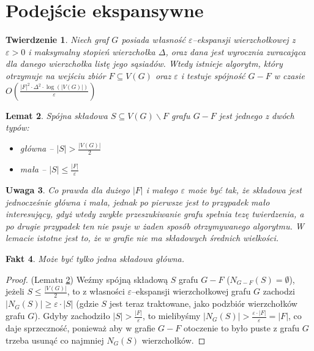 \documentclass{pracamgr}
\newtheorem{theorem}{Twierdzenie}[chapter]
\newtheorem{lemma}[theorem]{Lemat}
\newtheorem{remark}[theorem]{Uwaga}
\newtheorem{fact}[theorem]{Fakt}
\begin{document}
  \section{Podejście ekspansywne}\label{podejscie ekspansywne}
   \begin{theorem}\label{Spójność ekspansywna}
    Niech graf $G$ posiada własność $\varepsilon$--ekspansji wierzchołkowej z $\varepsilon>0$ i maksymalny stopień wierzchołka $\Delta$,
    oraz dana jest wyrocznia zwracająca dla danego wierzchołka listę jego sąsiadów.
    Wtedy istnieje algorytm, który otrzymuje na wejściu zbiór $F\subseteq V(G)$ oraz $\varepsilon$
    i testuje spójność $G-F$ w czasie $O\left(\frac{|F|^2\cdot\Delta^2\cdot\log(|V(G)|)}{\varepsilon}\right)$
   \end{theorem}
   \begin{lemma}\label{klasyfikacja skladowych}
    Spójna składowa $S\subseteq V(G)\backslash F$ grafu $G-F$ jest jednego z dwóch typów:
    \begin{itemize}
     \item główna -- $|S|>\frac{|V(G)|}{2}$
     \item mała -- $|S|\le\frac{|F|}{\varepsilon}$
    \end{itemize}
   \end{lemma}
   \begin{remark}\label{klasyfikacja skladowych 2}
    Co prawda dla dużego $|F|$ i małego $\varepsilon$ może być tak, że składowa jest jednocześnie główna i mała, jednak po pierwsze jest to przypadek mało
    interesujący, gdyż wtedy zwykłe przeszukiwanie grafu spełnia tezę twierdzenia, a po drugie przypadek ten nie psuje w żaden sposób otrzymywanego algorytmu.
    W lemacie istotne jest to, że w grafie nie ma składowych średnich wielkości.
   \end{remark}
   \begin{fact}\label{jedna glowna skladowa}
    Może być tylko jedna składowa główna.
   \end{fact}
   \begin{proof}
    (Lematu \ref{klasyfikacja skladowych})\newline
    Weźmy spójną składową $S$ grafu $G-F$ ($N_{G-F}(S)=\emptyset$), jeżeli $S\le\frac{|V(G)|}{2}$, to z własności $\varepsilon$--ekspansji wierzchołkowej grafu $G$
    zachodzi $|N_G(S)|\ge\varepsilon\cdot|S|$ (gdzie $S$ jest teraz traktowane, jako podzbiór wierzchołków grafu $G$). Gdyby zachodziło $|S|>\frac{|F|}{\varepsilon}$,
    to mielibyśmy $|N_G(S)|>\frac{\varepsilon\cdot|F|}{\varepsilon}=|F|$, co daje sprzeczność, ponieważ aby w grafie $G-F$ otoczenie to było puste z grafu
    $G$ trzeba usunąć co najmniej $N_G(S)$ wierzchołków.
   \end{proof}
\end{document}
